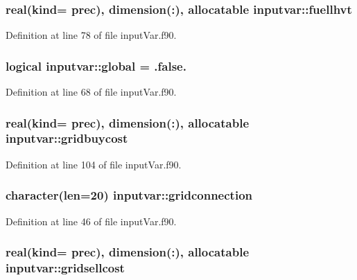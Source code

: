 \hypertarget{classinputvar_afe467edd87c4c589d3ad9d5b14825f94}{
\subsubsection[{fuellhvt}]{\setlength{\rightskip}{0pt plus 5cm}real(kind= prec), dimension(\-:), allocatable inputvar\-::fuellhvt}}\label{classinputvar_afe467edd87c4c589d3ad9d5b14825f94}


Definition at line 78 of file input\-Var.\-f90.

\hypertarget{classinputvar_aa558f36057a5ae647fb16b9659b90d04}{
\subsubsection[{global}]{\setlength{\rightskip}{0pt plus 5cm}logical inputvar\-::global = .false.}}\label{classinputvar_aa558f36057a5ae647fb16b9659b90d04}


Definition at line 68 of file input\-Var.\-f90.

\hypertarget{classinputvar_a10f5c69ad85799dd2ae3a39500ba3005}{
\subsubsection[{gridbuycost}]{\setlength{\rightskip}{0pt plus 5cm}real(kind= prec), dimension(\-:), allocatable inputvar\-::gridbuycost}}\label{classinputvar_a10f5c69ad85799dd2ae3a39500ba3005}


Definition at line 104 of file input\-Var.\-f90.

\hypertarget{classinputvar_a8488f705094b7c59cf8cb06939fe9a7a}{
\subsubsection[{gridconnection}]{\setlength{\rightskip}{0pt plus 5cm}character(len=20) inputvar\-::gridconnection}}\label{classinputvar_a8488f705094b7c59cf8cb06939fe9a7a}


Definition at line 46 of file input\-Var.\-f90.

\hypertarget{classinputvar_a2f72c3ce64312b528c0679cbd950fb8f}{
\subsubsection[{gridsellcost}]{\setlength{\rightskip}{0pt plus 5cm}real(kind= prec), dimension(\-:), allocatable inputvar\-::gridsellcost}}\label{classinputvar_a2f72c3ce64312b528c0679cbd950fb8f}


